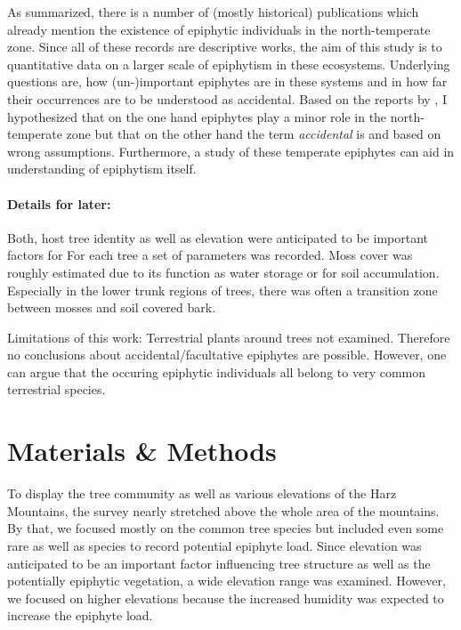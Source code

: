 \documentclass[12pt, a4paper, oneside, draft]{scrartcl}
\begin{document}
	As \textcite{Zotz2003} summarized, there is a number of (mostly historical) publications which already mention the existence of epiphytic individuals in the north-temperate zone. Since all of these records are descriptive works, the aim of this study is to  quantitative data on a larger scale of epiphytism in these ecosystems. Underlying questions are, how (un-)important epiphytes are in these systems and in how far their occurrences are to be understood as accidental. Based on the reports by , I hypothesized that on the one hand epiphytes play a minor role in the north-temperate zone but that on the other hand the term \textit{accidental} is  and based on wrong assumptions. Furthermore, a study of these temperate epiphytes can aid in understanding of epiphytism itself.
	
	
	
	\paragraph{Details for later:}
	Both, host tree identity as well as elevation were anticipated to be important factors for%
	For each tree a set of parameters was recorded. Moss cover was roughly estimated due to its function as water storage or for soil accumulation. 
	Especially in the lower trunk regions of trees, there was often a transition zone between mosses and soil covered bark. 
	
	
	Limitations of this work: Terrestrial plants around trees not examined. Therefore no conclusions  about accidental/facultative epiphytes are possible. However, one can argue that the occuring epiphytic individuals all belong to very common terrestrial species.

\section{Materials \& Methods} \label{sec:MM}
To display the tree community as well as various elevations of the Harz Mountains, the survey nearly stretched above the whole area of the mountains. By that, we focused mostly on the common tree species but included even some rare as well as  species to record potential epiphyte load. Since elevation was anticipated to be an important factor  influencing tree structure as well as the potentially epiphytic vegetation, a wide elevation range was examined. However, we focused on higher elevations because the increased humidity was expected to increase the epiphyte load.
\end{document}
